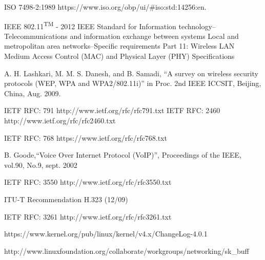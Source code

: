 \begin{thebibliography}{90}   
\rhead[\fancyplain{}{\bfseries \leftmark}]{\fancyplain{}{\bfseries
\thepage}}


 ISO 7498-2:1989 https://www.iso.org/obp/ui/\#iso:std:14256:en.

 IEEE 802.11\textsuperscript{TM} - 2012 IEEE Standard for Information technology--Telecommunications and information exchange between systems Local and metropolitan area networks--Specific requirements Part 11: Wireless LAN Medium Access Control (MAC) and Physical Layer (PHY) Specifications

 A. H. Lashkari, M. M. S. Danesh, and B. Samadi, ``A survey on wireless security protocols (WEP, WPA and WPA2/802.11i)'' in Proc. 2nd IEEE ICCSIT, Beijing, China, Aug. 2009.

 IETF RFC: 791 http://www.ietf.org/rfc/rfc791.txt
 IETF RFC: 2460 http://www.ietf.org/rfc/rfc2460.txt

 IETF RFC: 768 https://www.ietf.org/rfc/rfc768.txt

 B. Goode,``Voice Over Internet Protocol (VoIP)'', Proceedings of the IEEE, vol.90, No.9, sept. 2002

 IETF RFC: 3550 http://www.ietf.org/rfc/rfc3550.txt

 ITU-T Recommendation H.323 (12/09)

 IETF RFC: 3261 http://www.ietf.org/rfc/rfc3261.txt



 https://www.kernel.org/pub/linux/kernel/v4.x/ChangeLog-4.0.1

 http://www.linuxfoundation.org/collaborate/workgroups/networking/sk\_buff



\end{thebibliography}
